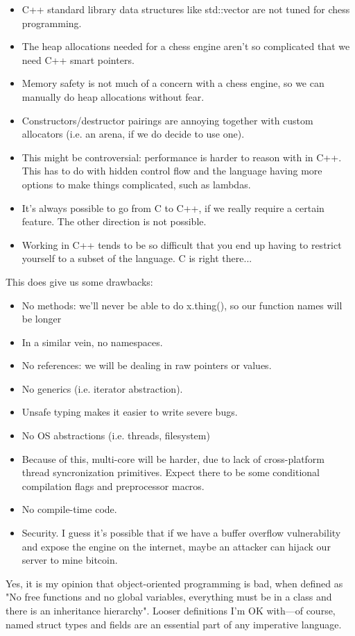 \documentclass{article}
\begin{document}
\begin{itemize}
\item C++ standard library data structures like std::vector are not tuned for chess programming.
\item The heap allocations needed for a chess engine aren’t so complicated that we need C++ smart pointers.
\item Memory safety is not much of a concern with a chess engine, so we can manually do heap allocations without fear.
\item Constructors/destructor pairings are annoying together with custom allocators (i.e. an arena, if we do decide to use one).
\item This might be controversial: performance is harder to reason with in C++. This has to do with hidden control flow and the language having more options to make things complicated, such as lambdas.
\item It's always possible to go from C to C++, if we really require a certain feature. The other direction is not possible.
\item Working in C++ tends to be so difficult that you end up having to restrict yourself to a subset of the language. C is right there...
\end{itemize}
This does give us some drawbacks:
\begin{itemize}
\item No methods: we’ll never be able to do x.thing(), so our function names will be longer
\item In a similar vein, no namespaces.
\item No references: we will be dealing in raw pointers or values.
\item No generics (i.e. iterator abstraction).
\item Unsafe typing makes it easier to write severe bugs.
\item No OS abstractions (i.e. threads, filesystem)
\item Because of this, multi-core will be harder, due to lack of cross-platform thread syncronization primitives.
Expect there to be some conditional compilation flags and preprocessor macros.
\item No compile-time code.
\item Security. I guess it’s possible that if we have a buffer overflow vulnerability and expose the engine on the internet, maybe an attacker can hijack our server to mine bitcoin.
\end{itemize}
Yes, it is my opinion that object-oriented programming is bad, when defined as "No free functions and no global variables, everything must be in a class and there is an inheritance hierarchy". Looser definitions I'm OK with---of course, named struct types and fields are an essential part of any imperative language. 
\end{document}
